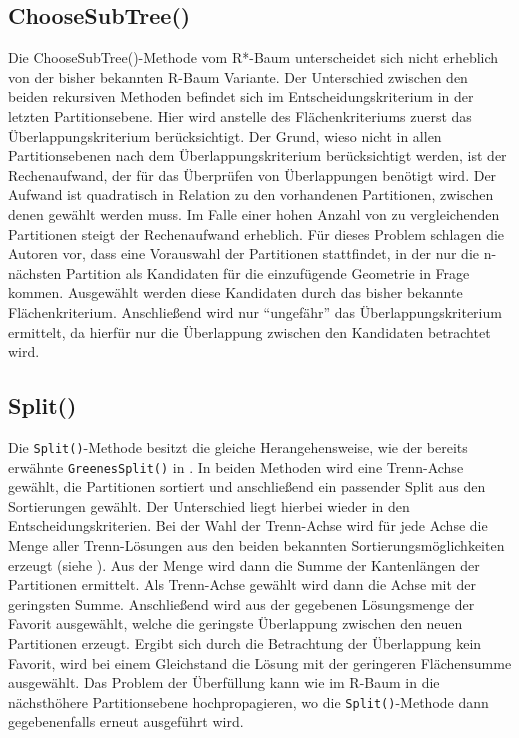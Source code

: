 \documentclass[runningheads,a4paper]{llncs}
\begin{document}
	\subsection{ChooseSubTree()}
	Die ChooseSubTree()-Methode vom R*-Baum unterscheidet sich nicht erheblich von der bisher bekannten R-Baum Variante. Der Unterschied zwischen den beiden rekursiven Methoden befindet sich im Entscheidungskriterium in der letzten Partitionsebene. Hier wird anstelle des Flächenkriteriums zuerst das Überlappungskriterium berücksichtigt. Der Grund, wieso nicht in allen Partitionsebenen nach dem Überlappungskriterium berücksichtigt werden, ist der Rechenaufwand, der für das Überprüfen von Überlappungen benötigt wird. Der Aufwand ist quadratisch in Relation zu den vorhandenen Partitionen, zwischen denen gewählt werden muss. Im Falle einer hohen Anzahl von zu vergleichenden Partitionen steigt der Rechenaufwand erheblich. Für dieses Problem schlagen die Autoren vor, dass eine Vorauswahl der Partitionen stattfindet, in der nur die n-nächsten Partition als Kandidaten für die einzufügende Geometrie in Frage kommen. Ausgewählt werden diese Kandidaten durch das bisher bekannte Flächenkriterium. Anschließend wird nur \enquote{ungefähr} das Überlappungskriterium ermittelt, da hierfür nur die Überlappung zwischen den Kandidaten betrachtet wird.

	\subsection{Split()}
	Die \texttt{Split()}-Methode besitzt die gleiche Herangehensweise, wie der bereits erwähnte \texttt{GreenesSplit()} in . In beiden Methoden wird eine Trenn-Achse gewählt, die Partitionen sortiert und anschließend ein passender Split aus den Sortierungen gewählt. Der Unterschied liegt hierbei wieder in den Entscheidungskriterien. Bei der Wahl der Trenn-Achse wird für jede Achse die Menge aller Trenn-Lösungen aus den beiden bekannten Sortierungsmöglichkeiten erzeugt (siehe ). Aus der Menge wird dann die Summe der Kantenlängen der Partitionen ermittelt. Als Trenn-Achse gewählt wird dann die Achse mit der geringsten Summe.
	Anschließend wird aus der gegebenen Lösungsmenge der Favorit ausgewählt, welche die geringste Überlappung zwischen den neuen Partitionen erzeugt. Ergibt sich durch die Betrachtung der Überlappung kein Favorit, wird bei einem Gleichstand die Lösung mit der geringeren Flächensumme ausgewählt. Das Problem der Überfüllung kann wie im R-Baum in die nächsthöhere Partitionsebene hochpropagieren, wo die \texttt{Split()}-Methode dann gegebenenfalls erneut ausgeführt wird.
\end{document}
